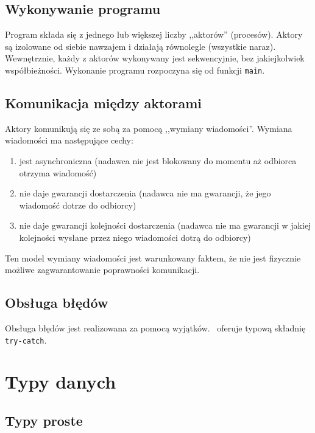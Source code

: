 \subsection{Wykonywanie programu}

Program składa się z jednego lub większej liczby ,,aktorów'' (procesów).
Aktory są izolowane od siebie nawzajem i działają równolegle (wszystkie naraz).
Wewnętrznie, każdy z aktorów wykonywany jest sekwencyjnie, bez jakiejkolwiek
współbieżności.
Wykonanie programu rozpoczyna się od funkcji \texttt{main}.

\subsection{Komunikacja między aktorami}

Aktory komunikują się ze sobą za pomocą ,,wymiany wiadomości''.
Wymiana wiadomości ma następujące cechy:

\begin{enumerate}
    \item jest asynchroniczna (nadawca nie jest blokowany do momentu aż odbiorca otrzyma
        wiadomość)
    \item nie daje gwarancji dostarczenia (nadawca nie ma gwarancji, że jego wiadomość
        dotrze do odbiorcy)
    \item nie daje gwarancji kolejności dostarczenia (nadawca nie ma gwarancji w jakiej
        kolejności wysłane przez niego wiadomości dotrą do odbiorcy)
\end{enumerate}

Ten model wymiany wiadomości jest warunkowany faktem, że nie jest fizycznie
możliwe zagwarantowanie poprawności komunikacji.

\subsection{Obsługa błędów}

Obsługa błędów jest realizowana za pomocą wyjątków. \ViuAct\ oferuje typową
składnię \texttt{try-catch}.

\section{Typy danych}

\subsection{Typy proste}

